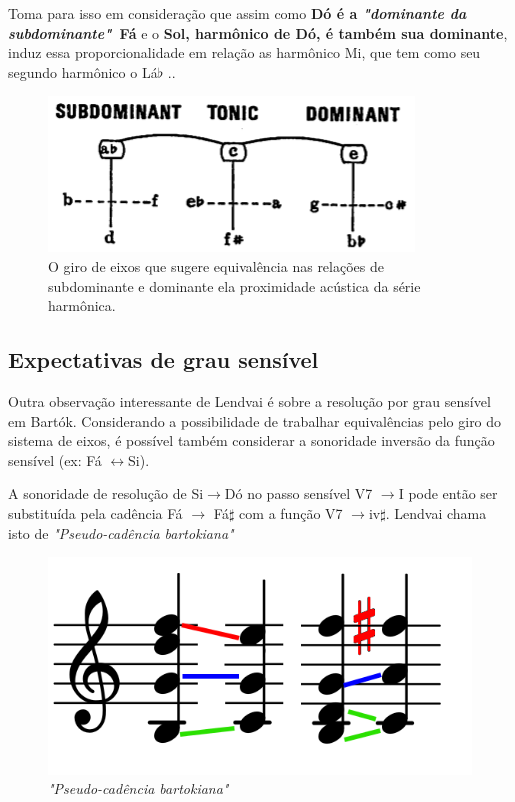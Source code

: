 \documentclass[
	12pt,				%
	openright,			%
	twoside,			%
	a4paper,			%
	english,			%
	french,				%
	spanish,			%
	brazil				%
	]{abntex2}
\begin{document}
Toma para isso em consideração que assim como \textbf{Dó é a \textit{"dominante da subdominante"}\ Fá} e o \textbf{Sol, harmônico de Dó, é também sua dominante}, induz essa proporcionalidade em relação as harmônico Mi, que tem como seu segundo harmônico o Lá$\flat$ .\cite[p. 11]{lendvai1971bela}.

\begin{figure}[!h]
	\caption{\label{fig_grafico}O giro de eixos que sugere equivalência nas relações de subdominante e dominante ela proximidade acústica da série harmônica. }
	\begin{center}
	    \includegraphics[scale=0.5]{axis/giro_de_eixos.png}
	\end{center}
\end{figure}


\pagebreak
\subsection{Expectativas de grau sensível}

Outra observação interessante de Lendvai é sobre a resolução por grau sensível em Bartók. Considerando a possibilidade de trabalhar equivalências pelo giro do sistema de eixos, é possível também considerar a sonoridade inversão da função sensível (ex: Fá $\leftrightarrow$Si).

A sonoridade de resolução de Si$\rightarrow$Dó no passo sensível V7 $\rightarrow$I pode então ser substituída pela cadência Fá  $\rightarrow$ Fá$\sharp$ com a função  V7 $\rightarrow$iv$\sharp$. Lendvai chama isto de \textit{"Pseudo-cadência bartokiana"}\cite[p. 13]{lendvai1971bela}

\begin{figure}[!h]
	\caption{\label{fig_grafico}\textit{"Pseudo-cadência bartokiana"} }
	\begin{center}
	    \includegraphics[scale=0.4]{axis/resolve.png}
	\end{center}
\end{figure}
\end{document}
